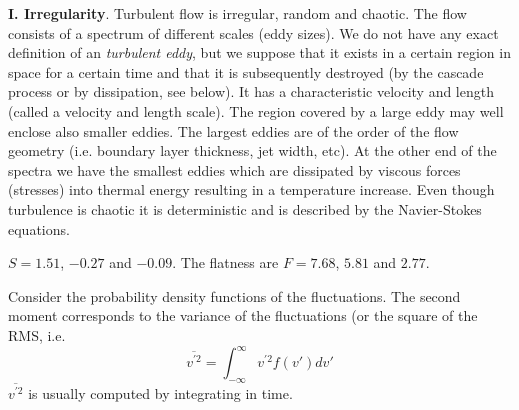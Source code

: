 \documentclass[a4paper]{article}
\begin{document}
{\bf I. Irregularity}. Turbulent flow is irregular, random and chaotic.  The flow consists
of a spectrum of different scales (eddy sizes).
We do not have any exact definition of an \emph{turbulent eddy}, but
we suppose that it exists in a certain region in space for a certain time and that it is subsequently
destroyed (by the cascade process or by dissipation, see below).
It has a characteristic velocity and length (called a velocity and length scale). The region
covered by a large eddy may well enclose also smaller eddies.
The largest eddies are of the order of the flow geometry (i.e. boundary layer thickness,
jet width, etc).
At the other end of the spectra we have the smallest eddies
which are dissipated by viscous forces (stresses) into thermal energy resulting in a temperature increase. Even though
turbulence is chaotic it is deterministic and is described by the Navier-Stokes equations.

 $S=1.51$, $-0.27$ and $-0.09$. The flatness
are $F= 7.68$, $5.81$ and $2.77$.




Consider the  probability density functions of the fluctuations. 
The second moment corresponds to the variance of the fluctuations (or the square of the RMS, i.e.
%
\begin{equation*}
\overline{v^{\prime 2}}= \int_{-\infty}^\infty v^{\prime 2} f(v') dv'
\end{equation*}
%
$\overline{v^{\prime 2}}$ is usually computed by integrating in time.
\end{document}
